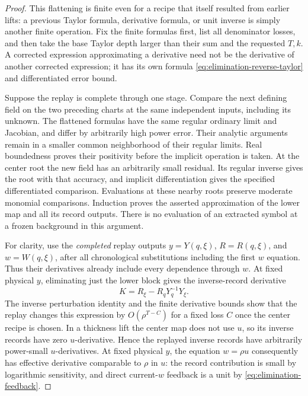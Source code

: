 \begin{proof}
This flattening is finite even for a recipe that itself resulted from
earlier lifts: a previous Taylor formula, derivative formula, or unit
inverse is simply another finite operation.  Fix the finite formulas
first, list all denominator losses, and then take the base Taylor
depth larger than their sum and the requested $T,k$.  A corrected
expression approximating a derivative need not be the derivative of
another corrected expression; it has its own formula
\eqref{eq:elimination-reverse-taylor} and differentiated error bound.

Suppose the replay is complete through one stage.  Compare the next
defining field on the two preceding charts at the same independent
inputs, including its unknown.  The flattened formulas have the same
regular ordinary limit and Jacobian, and differ by arbitrarily high
power error.  Their analytic arguments remain in a smaller common
neighborhood of their regular limits.  Real boundedness proves their
positivity before the implicit operation is taken.  At the center
root the new field has an arbitrarily small residual.  Its regular
inverse gives the root with that accuracy, and implicit differentiation
gives the specified differentiated comparison.  Evaluations at these
nearby roots preserve moderate monomial comparisons.  Induction proves
the asserted approximation of the lower map and all its record
outputs.  There is no evaluation of an extracted symbol at a frozen
background in this argument.

For clarity, use the \emph{completed} replay outputs
$y=Y(q,\xi)$, $R=R(q,\xi)$, and $w=W(q,\xi)$, after all
chronological substitutions including the first $w$ equation.
Thus their derivatives already include every dependence through $w$.
At fixed physical $y$, eliminating just the lower block gives the
inverse-record derivative
\begin{equation}\label{eq:elimination-inverse-record}
 K=R_\xi-R_qY_q^{-1}Y_\xi.
\end{equation}
The inverse perturbation identity and the finite derivative bounds
show that the replay changes this expression by $O(\rho^{T-C})$
for a fixed loss $C$ once the center recipe is chosen.  In a thickness
lift the center map does not use $u$, so its inverse records have zero
$u$-derivative.  Hence the replayed inverse records have arbitrarily
power-small $u$-derivatives.  At fixed physical $y$, the equation
$w=\rho u$ consequently has effective derivative comparable to
$\rho$ in $u$: the record contribution is small by logarithmic
sensitivity, and direct current-$w$ feedback is a unit by
\eqref{eq:elimination-feedback}.


\end{proof}
